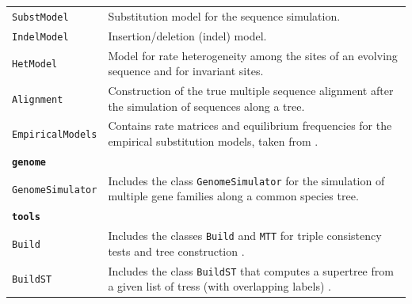 \documentclass[hidelinks,11pt]{article}
\begin{document}
{\begin{longtable}{| p{4.0cm} | p{10cm} |}
	\texttt{SubstModel} &
	Substitution model for the sequence simulation. \\
	\texttt{IndelModel} &
	Insertion/deletion (indel) model. \\
	\texttt{HetModel} &
	Model for rate heterogeneity among the sites of an evolving sequence and for invariant sites. \\
	\texttt{Alignment} &
	Construction of the true multiple sequence alignment after the simulation of sequences along a tree. \\
	\texttt{EmpiricalModels} &
	Contains rate matrices and equilibrium frequencies for the empirical 
	substitution models, taken from \citep{criscuolo}. \\
  \hline
  \multicolumn{2}{|l|}{\textbf{\texttt{genome}}}\\
  \hline
  \texttt{GenomeSimulator} &
  Includes the class \texttt{GenomeSimulator} for the simulation of multiple 
  gene families along a common species tree. \\
	\hline
	\multicolumn{2}{|l|}{\textbf{\texttt{tools}}}\\
	\hline
  \texttt{Build} &
  Includes the classes \texttt{Build} and \texttt{MTT} for triple 
  consistency tests and tree construction \citep{aho1981, he2006}. \\
	\texttt{BuildST} &
	Includes the class \texttt{BuildST} that computes a supertree from a given 
	list of tress (with overlapping labels) \citep{deng2016}. \\

\end{longtable}}
\end{document}
